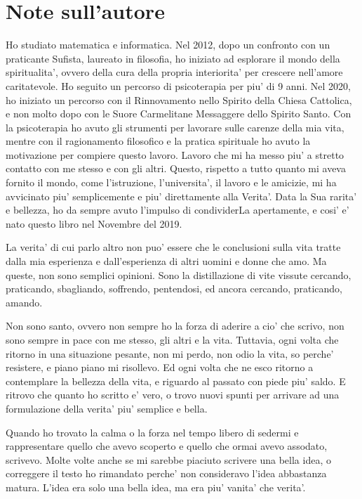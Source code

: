 
\chapter{Note sull'autore}

Ho studiato matematica e informatica. Nel 2012, dopo un confronto con un praticante Sufista, laureato in filosofia, ho iniziato ad esplorare il mondo della spiritualita', ovvero della cura della propria interiorita' per crescere nell'amore caritatevole. Ho seguito un percorso di psicoterapia per piu' di 9 anni. Nel 2020, ho iniziato un percorso con il Rinnovamento nello Spirito della Chiesa Cattolica, e non molto dopo con le Suore Carmelitane Messaggere dello Spirito Santo. Con la psicoterapia ho avuto gli strumenti per lavorare sulle carenze della mia vita, mentre con il ragionamento filosofico e la pratica spirituale ho avuto la motivazione per compiere questo lavoro. Lavoro che mi ha messo piu' a stretto contatto con me stesso e con gli altri. Questo, rispetto a tutto quanto mi aveva fornito il mondo, come l'istruzione, l'universita', il lavoro e le amicizie, mi ha avvicinato piu' semplicemente e piu' direttamente alla Verita'. Data la Sua rarita' e bellezza, ho da sempre avuto l'impulso di condividerLa apertamente, e cosi' e' nato questo libro nel Novembre del 2019.

La verita' di cui parlo altro non puo' essere che le conclusioni sulla vita tratte dalla mia esperienza e dall'esperienza di altri uomini e donne che amo. Ma queste, non sono semplici opinioni. Sono la distillazione di vite vissute cercando, praticando, sbagliando, soffrendo, pentendosi, ed ancora cercando, praticando, amando.

Non sono santo, ovvero non sempre ho la forza di aderire a cio' che scrivo, non sono sempre in pace con me stesso, gli altri e la vita. Tuttavia, ogni volta che ritorno in una situazione pesante, non mi perdo, non odio la vita, so perche' resistere, e piano piano mi risollevo. Ed ogni volta che ne esco ritorno a contemplare la bellezza della vita, e riguardo al passato con piede piu' saldo. E ritrovo che quanto ho scritto e' vero, o trovo nuovi spunti per arrivare ad una formulazione della verita' piu' semplice e bella. 

Quando ho trovato la calma o la forza nel tempo libero di sedermi e rappresentare quello che avevo scoperto e quello che ormai avevo assodato, scrivevo. Molte volte anche se mi sarebbe piaciuto scrivere una bella idea, o correggere il testo ho rimandato perche' non consideravo l'idea abbastanza matura. L'idea era solo una bella idea, ma era piu' vanita' che verita'. 

